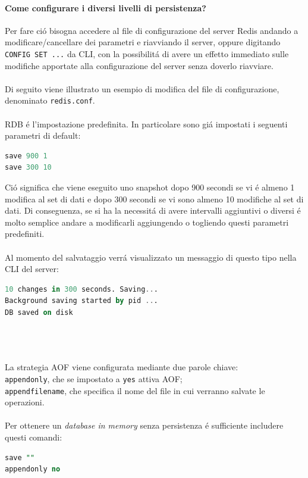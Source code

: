 \paragraph{Come configurare i diversi livelli di persistenza?\\}
Per fare ció bisogna accedere al file di configurazione del server Redis andando a modificare/cancellare dei parametri e riavviando il server,
oppure digitando \texttt{CONFIG SET ...} da CLI, con la possibilitá di avere un effetto immediato sulle modifiche apportate alla configurazione del server senza doverlo riavviare.\\
\\
Di seguito viene illustrato un esempio di modifica del file di configurazione, denominato \texttt{redis.conf}.\\
\\
RDB é l'impostazione predefinita. In particolare sono giá impostati i seguenti parametri di default:
\begin{lstlisting}[autogobble, style=redis-cli, language=SQL]
save 900 1
save 300 10\end{lstlisting}
Ció significa che viene eseguito uno snapshot dopo 900 secondi se vi é almeno 1 modifica al set di dati e dopo
300 secondi se vi sono almeno 10 modifiche al set di dati.
Di conseguenza, se si ha la necessitá di avere intervalli aggiuntivi o diversi é molto semplice andare a modificarli aggiungendo o togliendo questi parametri predefiniti.\\
\\
Al momento del salvataggio verrá visualizzato un messaggio di questo tipo nella CLI del server:
\begin{lstlisting}[autogobble, style=redis-cli, language=SQL]
10 changes in 300 seconds. Saving...
Background saving started by pid ...
DB saved on disk\end{lstlisting}\\
\\
\\
La strategia AOF viene configurata mediante due parole chiave:\\
\texttt{appendonly}, che se impostato a \texttt{yes} attiva AOF;\\
\texttt{appendfilename}, che specifica il nome del file in cui verranno salvate le operazioni.\\
\\
Per ottenere un \emph{database in memory} senza persistenza é sufficiente includere questi comandi:
\begin{lstlisting}[autogobble, style=redis-cli, language=SQL]
save ""
appendonly no\end{lstlisting}



